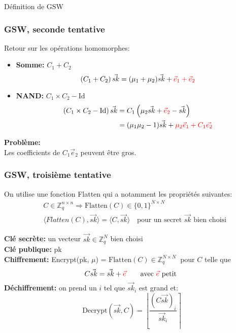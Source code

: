\documentclass[10pt,xcolor={usenames,dvipsnames}]{beamer}
\newcommand{\ZZq}{\mathbb{Z}_q}
\begin{document}
\begin{section}{Définition de GSW}


\begin{frame} 
\frametitle{GSW, seconde tentative}
Retour sur les opérations homomorphes:
\begin{itemize}
\item \textbf{Somme:} $C_1 + C_2\quad$
\[\left(C_1 + C_2\right) \vec{sk} = (\mu_1 + \mu_2) \vec{sk} + {\color{red}\vec{e}_1 + \vec{e}_2}\]
\item \textbf{NAND:} $C_1 \times C_2 - \text{Id}$
\begin{align*}
\left(C_1 \times C_2 - \text{Id}\right) \vec{sk} &= C_1\left(\mu_2\vec{sk} + {\color{red}\vec{e}_2} - \vec{sk}\right) \\
&= (\mu_1 \mu_2 - 1) \vec{sk} + {\color{red}\mu_2 \vec{e}_1 + C_1 \vec{e_2}}
\end{align*}
\end{itemize}

\textbf{Problème:} \\
Les coefficients de $C_1 \vec{e}_2$ peuvent être gros.

\end{frame} 

  
\begin{frame} 
\frametitle{GSW, troisième tentative}
On utilise une fonction Flatten qui a notamment les propriétés suivantes:
\begin{align*}
&C \in \ZZq^{n \times n} \Rightarrow \text{Flatten}(C) \in \{0,1\}^{N \times N} \\
& \langle Flatten(C), \vec{sk} \rangle = \langle C, \vec{sk} \rangle \quad\text{pour un secret }\vec{sk}\text{ bien choisi}
\end{align*}

\textbf{Clé secrète:} un vecteur $\vec{sk} \in \ZZq^{N}$ bien choisi\\
\textbf{Clé publique:} pk\\
\textbf{Chiffrement:} Encrypt(pk, $\mu$) = $\text{Flatten}(C)\in \ZZq^{N \times N}\:$ pour $C$ telle que  
\[C \vec{sk} = \vec{sk} + {\color{red}\vec{e}}\qquad \text{avec }  {\color{red}\vec{e}} \text{ petit} \]
\textbf{Déchiffrement:} on prend un $i$ tel que $\vec{sk}_i$ est grand et:
\[\text{Decrypt}(\vec{sk}, C) = \left\lfloor \frac{{\left(C\vec{sk}\right)}_i}{\vec{sk}_i} \right\rceil \]


\end{frame}
\end{section}
\end{document}
